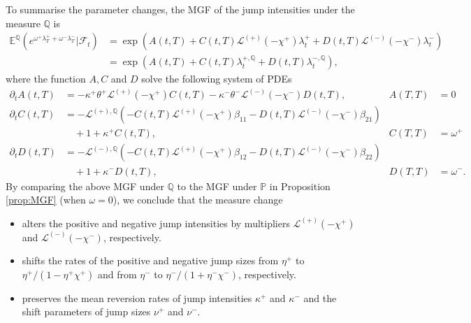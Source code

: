 \documentclass[11pt,a4paper]{article}
\numberwithin{equation}{section}
\theoremstyle{remark}
\theoremstyle{definition}
\newcommand{\E}{{\mathbb{E}}}
\begin{document}
To summarise the parameter changes, the MGF of the jump intensities under the measure $\mathbb{Q}$ is
\begin{align*}
    \E^\mathbb{Q}\left(e^{\omega^+\lambda^+_T + \omega^-\lambda^-_T}|\mathcal{F}_t\right)
    &= \exp\left(A(t,T) + C(t,T)\mathcal{L}^{(+)}(-\chi^+)\lambda^+_t+ D(t,T)\mathcal{L}^{(-)}(-\chi^-)\lambda^-_t\right)\\
    &= \exp\left(A(t,T) + C(t,T)\lambda^{+, \mathbb{Q}}_t+ D(t,T)\lambda^{-, \mathbb{Q}}_t\right),
\end{align*}
where the function $A, C$ and $D$ solve the following system of PDEs
\begin{align*}
    \partial_t A(t,T) &= -\kappa^+\theta^+\mathcal{L}^{(+)}(-\chi^+)C(t,T)-\kappa^-\theta^-\mathcal{L}^{(-)}(-\chi^-)D(t,T), &A(T,T)&=0\\
    \partial_t C(t,T) &= -\mathcal{L}^{(+),\mathbb{Q}}(-C(t,T)\mathcal{L}^{(+)}(-\chi^+)\beta_{11}-D(t,T)\mathcal{L}^{(-)}(-\chi^-)\beta_{21})\\
    &\quad+1 + \kappa^+C(t,T),&C(T,T)&=\omega^+\\
    \partial_t D(t,T) &= -\mathcal{L}^{(-),\mathbb{Q}}(-C(t,T)\mathcal{L}^{(+)}(-\chi^+)\beta_{12}-D(t,T)\mathcal{L}^{(-)}(-\chi^-)\beta_{22})\\
    &\quad+1 + \kappa^-D(t,T),&D(T,T)&=\omega^-.
\end{align*}
By comparing the above MGF under $\mathbb{Q}$ to the MGF under $\mathbb{P}$ in Proposition \ref{prop:MGF} (when $\omega=0$), we conclude that the measure change
\begin{itemize}
    \item alters the positive and negative jump intensities by multipliers $\mathcal{L}^{(+)}(-\chi^+)$ and $\mathcal{L}^{(-)}(-\chi^-)$, respectively.
    \item shifts the rates of the positive and negative jump sizes from $\eta^+$ to $\eta^+/(1-\eta^+\chi^+)$ and from $\eta^-$ to $\eta^-/(1+\eta^-\chi^-)$, respectively.
    \item preserves the mean reversion rates of jump intensities $\kappa^+$ and $\kappa^-$ and the shift parameters of jump sizes $\nu^+$ and $\nu^-$.
\end{itemize}
\end{document}

